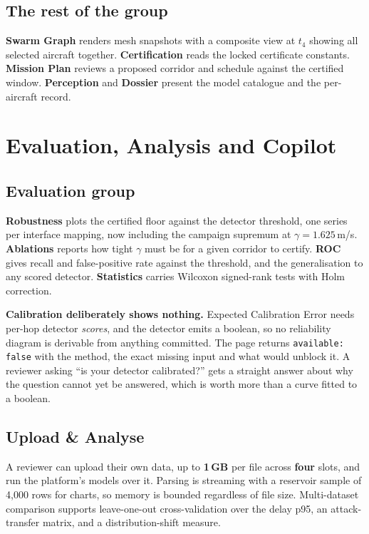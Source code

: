 \documentclass[11pt,a4paper]{article}
\newcommand{\code}[1]{\texttt{#1}}
\begin{document}
\subsection{The rest of the group}
\textbf{Swarm Graph} renders mesh snapshots with a composite view at $t_4$
showing all selected aircraft together. \textbf{Certification} reads the locked
certificate constants. \textbf{Mission Plan} reviews a proposed corridor and
schedule against the certified window. \textbf{Perception} and \textbf{Dossier}
present the model catalogue and the per-aircraft record.

\section{Evaluation, Analysis and Copilot}

\subsection{Evaluation group}
\textbf{Robustness} plots the certified floor against the detector threshold,
one series per interface mapping, now including the campaign supremum at
$\gamma = 1.625$\,m/s. \textbf{Ablations} reports how tight $\gamma$ must be for
a given corridor to certify. \textbf{ROC} gives recall and false-positive rate
against the threshold, and the generalisation to any scored detector.
\textbf{Statistics} carries Wilcoxon signed-rank tests with Holm correction.

\textbf{Calibration deliberately shows nothing.} Expected Calibration Error
needs per-hop detector \emph{scores}, and the detector emits a boolean, so no
reliability diagram is derivable from anything committed. The page returns
\code{available: false} with the method, the exact missing input and what would
unblock it. A reviewer asking ``is your detector calibrated?'' gets a straight
answer about why the question cannot yet be answered, which is worth more than a
curve fitted to a boolean.

\subsection{Upload \& Analyse}
A reviewer can upload their own data, up to \textbf{1\,GB} per file across
\textbf{four} slots, and run the platform's models over it. Parsing is streaming with
a reservoir sample of 4,000 rows for charts, so memory is bounded regardless of
file size. Multi-dataset comparison supports leave-one-out cross-validation over
the delay p95, an attack-transfer matrix, and a distribution-shift measure.
\end{document}
